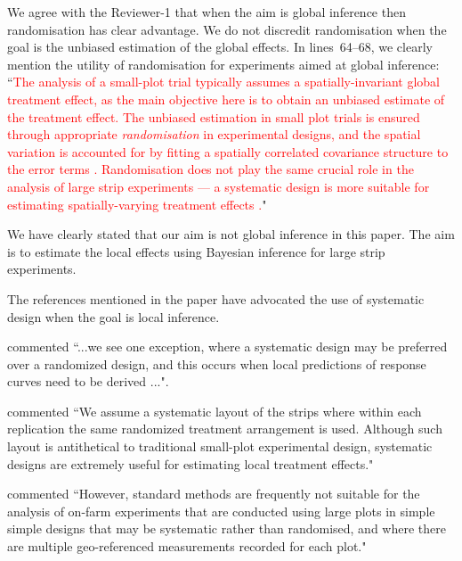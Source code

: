 \documentclass[a4paper]{article}   	%
\begin{document}
\begin{enumerate}
    We agree with the Reviewer-1 that when the aim is global inference then randomisation has clear advantage. We do not discredit randomisation when the goal is the unbiased estimation of the global effects. In lines~64--68, we clearly mention the utility of randomisation for experiments aimed at global inference:\\
    ``\textcolor{red}{The analysis of a small-plot trial typically assumes a spatially-invariant global treatment effect, as the main objective here is to obtain an unbiased estimate of the treatment effect. The unbiased estimation in small plot trials is ensured through appropriate \emph{randomisation} in experimental designs, and the spatial variation is accounted for by fitting a spatially correlated covariance structure to the error terms \parencite{Gilmour1997Accounting, Stefanova2009Enhanced}. Randomisation does not play the same crucial role in the analysis of large strip experiments --- a systematic design is more suitable for estimating spatially-varying treatment effects \parencite{Rakshit2020Novel, Piepho2011Statistical, Evans2020Assessment}.}"
    
    We have clearly stated that our aim is not global inference in this paper. The aim is to estimate the local effects using Bayesian inference for large strip experiments. 
    
    The references \parencite{Rakshit2020Novel, Piepho2011Statistical, Evans2020Assessment} mentioned in the paper have advocated the use of systematic design when the goal is local inference.
    
    \textcite{Piepho2011Statistical} commented ``...we see one exception, where a systematic design may be preferred over a randomized design, and this occurs when local predictions of response curves need to be derived ...".
    
    \textcite{Rakshit2020Novel} commented ``We assume a systematic layout of the strips where within each replication the same randomized treatment arrangement is used. Although such layout is antithetical to traditional small-plot experimental design, systematic designs are extremely useful for estimating local treatment effects."
    
    \textcite{Evans2020Assessment} commented ``However, standard methods are frequently not suitable for the analysis of on-farm experiments that are conducted using large plots in simple simple designs that may be systematic rather than randomised, and where there are multiple geo-referenced measurements recorded for each plot."
    

\end{enumerate}
\end{document}
